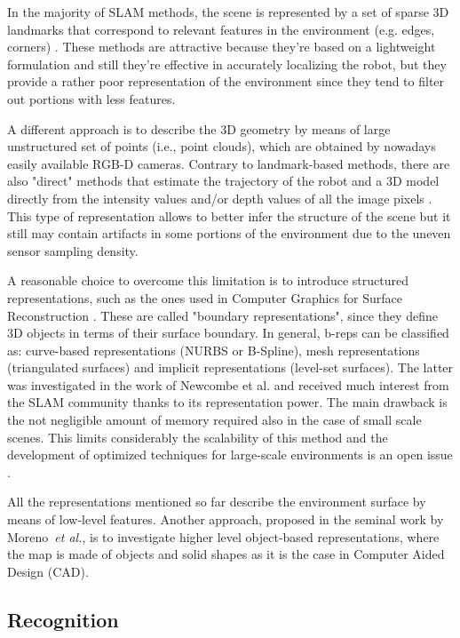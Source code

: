 \documentclass[letterpaper, 10 pt, conference]{ieeeconf}  %
\newcommand\etal{\emph{et al.}}
\begin{document}
In the majority of SLAM methods, the scene is represented by a set of sparse 3D landmarks that correspond to relevant features in the environment (e.g. edges, corners) \cite{mur2015ieeetransrob}.	These methods are attractive because they're based on a lightweight formulation and still they're effective in accurately localizing the robot, but they provide a rather poor representation of the environment since they tend to filter out portions with less features.

A different approach is to describe the 3D geometry by means of large unstructured set of points (i.e., point clouds), which are obtained by nowadays easily available RGB-D cameras. Contrary to landmark-based methods, there are also "direct" methods that estimate the trajectory of the robot and a 3D model directly from the intensity values and/or depth values of all the image pixels \cite{newcombe2011ICCV,steinbrucker2011real}. This type of representation allows to better infer the structure of the scene but it still may contain artifacts in some portions of the environment due to the uneven sensor sampling density.

A reasonable choice to overcome this limitation is to introduce structured representations, such as the ones used in Computer Graphics for Surface Reconstruction \cite{berger2014state}. These are called "boundary representations", since they define 3D objects in terms of their surface boundary. In general, b-reps can be classified as: curve-based representations (NURBS or B-Spline), mesh representations (triangulated surfaces) and implicit representations (level-set surfaces). The latter was investigated in the work of Newcombe et al. \cite{newcombe2011kinectfusion} and received much interest from the SLAM community thanks to its representation power. The main drawback is the not negligible amount of memory required also in the case of small scale scenes. This limits considerably the scalability of this method and the development of optimized techniques for large-scale environments is an open issue \cite{kahler2015very,vespa2018efficient}.

All the representations mentioned so far describe the environment surface by means of low-level features. Another approach, proposed in the seminal work by Moreno~\etal \cite{salas2013CVPR}, is to investigate higher level object-based representations, where the map is made of objects and solid shapes as it is the case in Computer Aided Design (CAD).

\subsection{Recognition}
\end{document}
